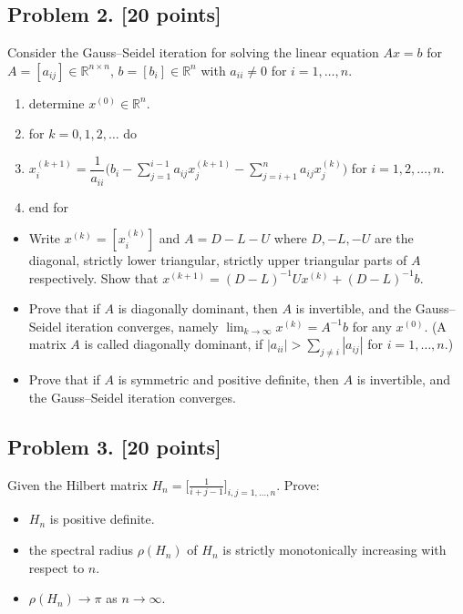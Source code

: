 \documentclass[11pt,a4paper]{article}
\begin{document}
\subsection{Problem 2. [20 points]}
Consider the Gauss--Seidel iteration for solving the linear equation \(Ax = b\) for \(A = [a_{ij}] \in \mathbb{R}^{n \times n}\), \(b = [b_{i}] \in \mathbb{R}^{n}\) with \(a_{ii} \neq 0\) for \(i = 1, \dots, n\).
\begin{enumerate}[label=\arabic*:,leftmargin=2em]
    \item determine \(x^{(0)} \in \mathbb{R}^{n}\).
    \item for \(k = 0, 1, 2, \dots\) do
    \item \(x_{i}^{(k+1)} = \dfrac{1}{a_{ii}} \bigl( b_{i} - \sum_{j=1}^{i-1} a_{ij} x_{j}^{(k+1)} - \sum_{j=i+1}^{n} a_{ij} x_{j}^{(k)} \bigr)\) for \(i = 1, 2, \dots, n\).
    \item end for
\end{enumerate}
\begin{itemize}
    \item Write \(x^{(k)} = [x_{i}^{(k)}]\) and \(A = D - L - U\) where \(D, -L, -U\) are the diagonal, strictly lower triangular, strictly upper triangular parts of \(A\) respectively. Show that \(x^{(k+1)} = (D - L)^{-1} U x^{(k)} + (D - L)^{-1} b\).
    \item Prove that if \(A\) is diagonally dominant, then \(A\) is invertible, and the Gauss--Seidel iteration converges, namely \(\lim_{k \to \infty} x^{(k)} = A^{-1} b\) for any \(x^{(0)}\). (A matrix \(A\) is called diagonally dominant, if \(|a_{ii}| > \sum_{j \neq i} |a_{ij}|\) for \(i = 1, \dots, n\).)
    \item Prove that if \(A\) is symmetric and positive definite, then \(A\) is invertible, and the Gauss--Seidel iteration converges.
\end{itemize}

\subsection{Problem 3. [20 points]}
Given the Hilbert matrix \(H_{n} = \bigl[\frac{1}{i+j-1}\bigr]_{i,j=1,\dots,n}\). Prove:
\begin{itemize}
    \item \(H_{n}\) is positive definite.
    \item the spectral radius \(\rho(H_{n})\) of \(H_{n}\) is strictly monotonically increasing with respect to \(n\).
    \item \(\rho(H_{n}) \to \pi\) as \(n \to \infty\).
\end{itemize}
\end{document}
